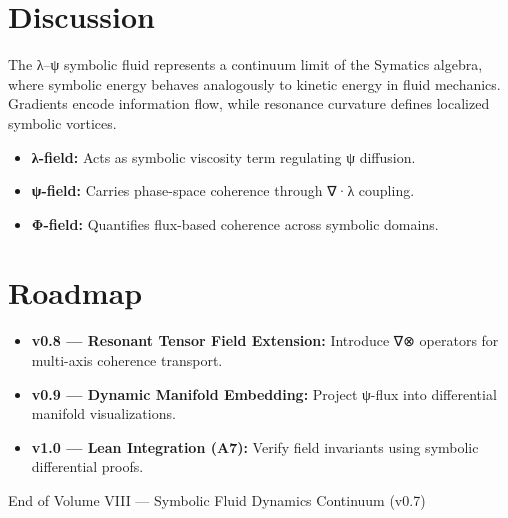 \documentclass[11pt]{article}
\begin{document}
\section{Discussion}
The λ–ψ symbolic fluid represents a continuum limit of the Symatics algebra,
where symbolic energy behaves analogously to kinetic energy in fluid mechanics.
Gradients encode information flow,
while resonance curvature defines localized symbolic vortices.

\begin{itemize}
  \item \textbf{λ-field:} Acts as symbolic viscosity term regulating ψ diffusion.  
  \item \textbf{ψ-field:} Carries phase-space coherence through ∇·λ coupling.  
  \item \textbf{Φ-field:} Quantifies flux-based coherence across symbolic domains.  
\end{itemize}

\section{Roadmap}
\begin{itemize}
  \item \textbf{v0.8 — Resonant Tensor Field Extension:}
    Introduce ∇⊗ operators for multi-axis coherence transport.  
  \item \textbf{v0.9 — Dynamic Manifold Embedding:}
    Project ψ-flux into differential manifold visualizations.  
  \item \textbf{v1.0 — Lean Integration (A7):}
    Verify field invariants using symbolic differential proofs.  
\end{itemize}

\vfill
\begin{center}
{\small\textcolor{tessarisgray}{End of Volume VIII — Symbolic Fluid Dynamics Continuum (v0.7)}}
\end{center}
\end{document}
